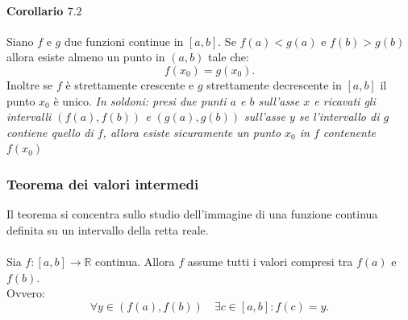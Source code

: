 \documentclass[x11names]{article}
\begin{document}
	\paragraph{Corollario $7.2$}
	Siano $f$ e $g$ due funzioni continue in $\left[a,b\right]$.  Se $f\left(a\right)<g\left(a\right)$ e $f\left(b\right)>g\left(b\right)$ allora esiste almeno un punto in $\left(a,b\right)$ tale che:
	\[
	f\left(x_0\right) = g\left(x_0\right)
	.\] 
	Inoltre se $f$ è strettamente crescente e $g$ strettamente decrescente in $\left[a,b\right]$ il punto $x_0$ è unico. \textit{In soldoni: presi due punti $a$ e $b$ sull'asse $x$ e ricavati gli intervalli $\left(f\left(a\right),f\left(b\right)\right)$ e $\left(g\left(a\right),g\left(b\right)\right)$ sull'asse $y$ se l'intervallo di $g$ contiene quello di $f$, allora esiste sicuramente un punto $x_0$ in $f$ contenente $f\left(x_0\right)$}
	\begin{center}
		
	\end{center}
	
	
	\begin{center}
		\colorbox{myred}{\begin{minipage}{5.75in}
				\begin{redes}{}
					\subsubsection{Teorema dei valori intermedi}
					Il teorema si concentra sullo studio dell'immagine di una funzione continua definita su un intervallo  della retta reale.
					\\ \\
					Sia $f:\left[a,b\right] \rightarrow \mathbb{R}$ continua. Allora $f$ assume tutti i valori compresi tra $f\left(a\right)$ e $f\left(b\right)$.
					\\
					Ovvero:
					\[
					\forall y \in \left(f\left(a\right),f\left(b\right)\right) \quad \exists c \in \left[a,b\right] : f\left(c\right) = y
					.\] 
				\end{redes}
		\end{minipage}}        
	\end{center}
	\begin{center}
		
	\end{center}
	
\end{document}
